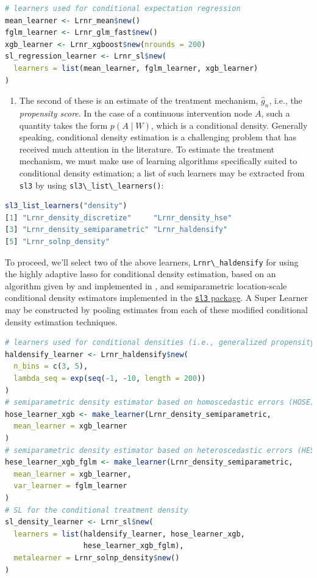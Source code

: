 \documentclass[
  12pt, krantz2,
]{book}
\newcommand{\passthrough}[1]{#1}
\providecommand{\tightlist}{%
  \setlength{\itemsep}{0pt}\setlength{\parskip}{0pt}}
\theoremstyle{definition}
\theoremstyle{definition}
\theoremstyle{definition}
\newcommand{\1}{\mathbbm{1}}
\begin{document}
\begin{lstlisting}[language=R]
# learners used for conditional expectation regression
mean_learner <- Lrnr_mean$new()
fglm_learner <- Lrnr_glm_fast$new()
xgb_learner <- Lrnr_xgboost$new(nrounds = 200)
sl_regression_learner <- Lrnr_sl$new(
  learners = list(mean_learner, fglm_learner, xgb_learner)
)
\end{lstlisting}

\begin{enumerate}
\def\labelenumi{\arabic{enumi}.}
\setcounter{enumi}{1}
\tightlist
\item
  The second of these is an estimate of the treatment mechanism, \(\hat{g}_n\),
  i.e., the \emph{propensity score}. In the case of a continuous intervention node
  \(A\), such a quantity takes the form \(p(A \mid W)\), which is a conditional
  density. Generally speaking, conditional density estimation is a challenging
  problem that has received much attention in the literature. To estimate the
  treatment mechanism, we must make use of learning algorithms specifically
  suited to conditional density estimation; a list of such learners may be
  extracted from \passthrough{\lstinline!sl3!} by using \passthrough{\lstinline!sl3\_list\_learners()!}:
\end{enumerate}

\begin{lstlisting}[language=R]
sl3_list_learners("density")
[1] "Lrnr_density_discretize"     "Lrnr_density_hse"           
[3] "Lrnr_density_semiparametric" "Lrnr_haldensify"            
[5] "Lrnr_solnp_density"         
\end{lstlisting}

To proceed, we'll select two of the above learners, \passthrough{\lstinline!Lrnr\_haldensify!} for using
the highly adaptive lasso for conditional density estimation, based on an
algorithm given by \citet{diaz2011super} and implemented in \citet{hejazi2020haldensify}, and
semiparametric location-scale conditional density estimators implemented in the
\href{https://github.com/tlverse/sl3}{\passthrough{\lstinline!sl3!} package}. A Super Learner may be
constructed by pooling estimates from each of these modified conditional
density estimation techniques.

\begin{lstlisting}[language=R]
# learners used for conditional densities (i.e., generalized propensity score)
haldensify_learner <- Lrnr_haldensify$new(
  n_bins = c(3, 5),
  lambda_seq = exp(seq(-1, -10, length = 200))
)
# semiparametric density estimator based on homoscedastic errors (HOSE)
hose_learner_xgb <- make_learner(Lrnr_density_semiparametric,
  mean_learner = xgb_learner
)
# semiparametric density estimator based on heteroscedastic errors (HESE)
hese_learner_xgb_fglm <- make_learner(Lrnr_density_semiparametric,
  mean_learner = xgb_learner,
  var_learner = fglm_learner
)
# SL for the conditional treatment density
sl_density_learner <- Lrnr_sl$new(
  learners = list(haldensify_learner, hose_learner_xgb,
                  hese_learner_xgb_fglm),
  metalearner = Lrnr_solnp_density$new()
)
\end{lstlisting}
\end{document}
